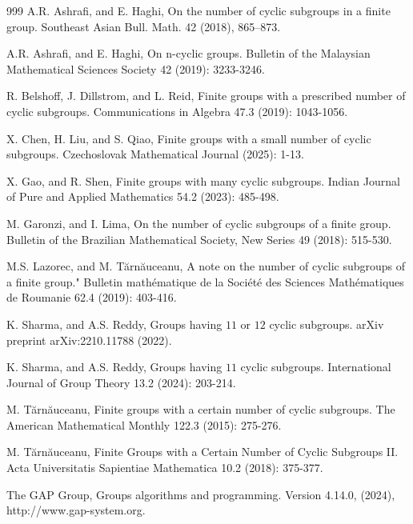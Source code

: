 \documentclass[a4paper,11pt]{amsart}
\numberwithin{equation}{section}
\numberwithin{equation}{subsection}
\begin{document}
\begin{thebibliography}{999}
A.R. Ashrafi, and E. Haghi, On the number of cyclic subgroups in a finite group. Southeast Asian Bull. Math. 42 (2018), 865–873.

A.R. Ashrafi, and E. Haghi, On n-cyclic groups. Bulletin of the Malaysian Mathematical Sciences Society 42 (2019): 3233-3246.

R. Belshoff, J. Dillstrom, and  L. Reid, Finite groups with a prescribed number of cyclic subgroups. Communications in Algebra 47.3 (2019): 1043-1056.



X. Chen, H. Liu, and S. Qiao, Finite groups with a small number of cyclic subgroups. Czechoslovak Mathematical Journal (2025): 1-13.

X. Gao, and R. Shen, Finite groups with many cyclic subgroups. Indian Journal of Pure and Applied Mathematics 54.2 (2023): 485-498.

M. Garonzi, and I. Lima, On the number of cyclic subgroups of a finite group. Bulletin of the Brazilian Mathematical Society, New Series 49 (2018): 515-530.

M.S. Lazorec, and M. Tărnăuceanu, A note on the number of cyclic subgroups of a finite group." Bulletin mathématique de la Société des Sciences Mathématiques de Roumanie 62.4 (2019): 403-416.





K. Sharma, and A.S. Reddy, Groups having $11 $ or $12 $ cyclic subgroups. arXiv preprint arXiv:2210.11788 (2022).

K. Sharma, and A.S. Reddy, Groups having $11 $ cyclic subgroups. International Journal of Group Theory 13.2 (2024): 203-214.


 M. Tărnăuceanu, Finite groups with a certain number of cyclic subgroups. The American Mathematical Monthly 122.3 (2015): 275-276.

M. Tărnăuceanu, Finite Groups with a Certain Number of Cyclic Subgroups II. Acta Universitatis Sapientiae Mathematica 10.2 (2018): 375-377.



 The GAP Group, Groups algorithms and programming. Version 4.14.0, (2024), http://www.gap-system.org.
\end{thebibliography}
\end{document}

